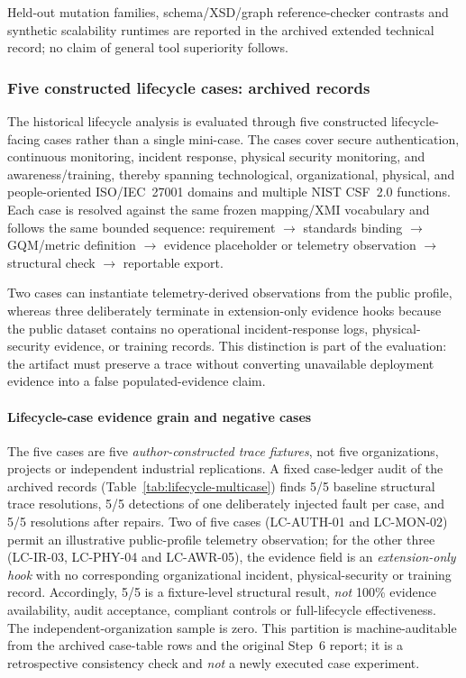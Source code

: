 \documentclass[12pt,a4paper]{article}
\begin{document}
Held-out mutation families, schema/XSD/graph reference-checker contrasts and synthetic scalability runtimes are reported in the archived extended technical record; no claim of general tool superiority follows.

\subsubsection{Five constructed lifecycle cases: archived records}
\label{sec:lifecycle-multicase}


The historical lifecycle analysis is evaluated through five constructed lifecycle-facing cases rather than a single mini-case. The cases cover secure authentication, continuous monitoring, incident response, physical security monitoring, and awareness/training, thereby spanning technological, organizational, physical, and people-oriented ISO/IEC~27001 domains and multiple NIST CSF~2.0 functions. Each case is resolved against the same frozen mapping/XMI vocabulary and follows the same bounded sequence: requirement $\rightarrow$ standards binding $\rightarrow$ GQM/metric definition $\rightarrow$ evidence placeholder or telemetry observation $\rightarrow$ structural check $\rightarrow$ reportable export.

Two cases can instantiate telemetry-derived observations from the public profile, whereas three deliberately terminate in extension-only evidence hooks because the public dataset contains no operational incident-response logs, physical-security evidence, or training records. This distinction is part of the evaluation: the artifact must preserve a trace without converting unavailable deployment evidence into a false populated-evidence claim.





\paragraph{Lifecycle-case evidence grain and negative cases}
The five cases are five \emph{author-constructed trace fixtures}, not five organizations, projects or independent industrial replications. A fixed case-ledger audit of the archived records (Table~\ref{tab:lifecycle-multicase}) finds 5/5 baseline structural trace resolutions, 5/5 detections of one deliberately injected fault per case, and 5/5 resolutions after repairs. Two of five cases (LC-AUTH-01 and LC-MON-02) permit an illustrative public-profile telemetry observation; for the other three (LC-IR-03, LC-PHY-04 and LC-AWR-05), the evidence field is an \emph{extension-only hook} with no corresponding organizational incident, physical-security or training record. Accordingly, 5/5 is a fixture-level structural result, \emph{not} 100\% evidence availability, audit acceptance, compliant controls or full-lifecycle effectiveness. The independent-organization sample is zero. This partition is machine-auditable from the archived case-table rows and the original Step~6 report; it is a retrospective consistency check and \emph{not} a newly executed case experiment.
\end{document}
